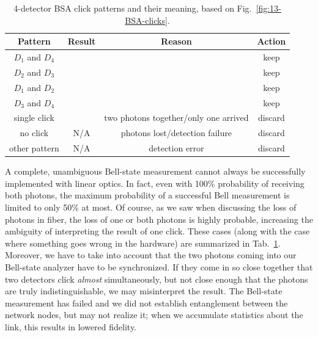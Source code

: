 \begin{table}
    \setcellgapes{3pt}
    \renewcommand\theadfont{}
    \makegapedcells
    \centering
    \begin{tabular}{cccc}
    \hline
        \textbf{Pattern}  & \textbf{Result} & \textbf{Reason} & \textbf{Action} \\
        \hline
        $D_1$ and $D_4$ & \ket{\Psi^-} & & \textcolor{mygreen}{keep} \\
        $D_2$ and $D_3$ & \ket{\Psi^-} & & \textcolor{mygreen}{keep} \\
        $D_1$ and $D_2$ & \ket{\Psi^+} & & \textcolor{mygreen}{keep} \\
        $D_3$ and $D_4$ & \ket{\Psi^+} & & \textcolor{mygreen}{keep} \\
        single click & \ket{\Phi^\pm}  & two photons together/only one arrived & \textcolor{myred}{discard} \\
        no click & N/A & photons lost/detection failure & \textcolor{myred}{discard} \\
        other pattern & N/A & detection error & \textcolor{myred}{discard} \\
        \hline
    \end{tabular}
    \caption[Four-detector BSA click patterns.]{4-detector BSA click patterns and their meaning, based on Fig.~\ref{fig:13-BSA-clicks}.}
    \label{tab:bsa-clicks}
\end{table}

A complete, unambiguous Bell-state measurement cannot always be successfully implemented with linear optics.
In fact, even with 100\% probability of receiving both photons, the maximum probability of a successful Bell measurement is limited to only 50\% at most.
Of course, as we saw when discussing the loss of photons in fiber, the loss of one or both photons is highly probable, increasing the ambiguity of interpreting the result of one click.
These cases (along with the case where something goes wrong in the hardware) are summarized in Tab.~\ref{tab:bsa-clicks}. 
Moreover, we have to take into account that the two photons coming into our Bell-state analyzer have to be synchronized.
If they come in so close together that two detectors click \emph{almost} simultaneously, but not close enough that the photons are truly indistinguishable, we may misinterpret the result.
The Bell-state measurement has failed and we did not establish entanglement between the network nodes, but may not realize it; when we accumulate statistics about the link, this results in lowered fidelity.




